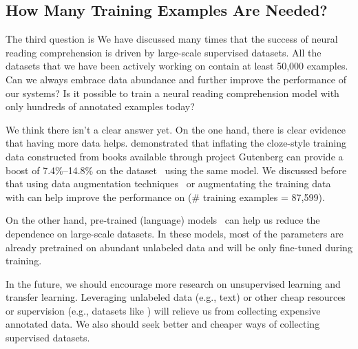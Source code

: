 \subsection{How Many Training Examples Are Needed?}
The third question is  We have discussed many times that the success of neural reading comprehension is driven by large-scale supervised datasets. All the datasets that we have been actively working on contain at least 50,000 examples. Can we always embrace data abundance and further improve the performance of our systems? Is it possible to train a neural reading comprehension model with only hundreds of annotated examples today?

We think there isn't a clear answer yet. On the one hand, there is clear evidence that having more data helps.  demonstrated that inflating the cloze-style training data constructed from books available through project Gutenberg can provide a boost of 7.4\%--14.8\% on the  dataset~\cite{hill2016goldilocks} using the same model. We discussed before that using data augmentation techniques~\cite{yu2018qanet} or augmentating the training data with  can help improve the performance on  (\# training examples = 87,599).

On the other hand, pre-trained (language) models~\cite{radford2018improving,devlin2018bert} can help us reduce the dependence on large-scale datasets. In these models, most of the parameters are already pretrained on abundant unlabeled data and will be only fine-tuned during training.

In the future, we should encourage more research on unsupervised learning and transfer learning. Leveraging unlabeled data (e.g., text) or other cheap resources or supervision (e.g., datasets like ) will relieve us from collecting expensive annotated data. We also should seek better and cheaper ways of collecting supervised datasets.
%
